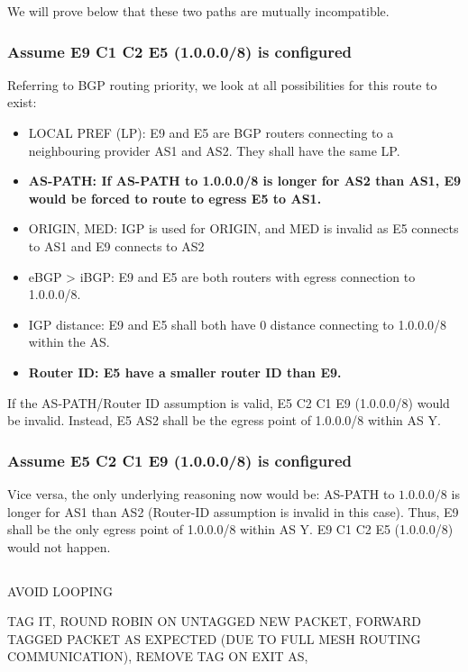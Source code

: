 \documentclass[12pt]{article}
\begin{document}
We will prove below that these two paths are mutually incompatible.

\subsubsection{Assume E9 \textrightarrow{} C1 \textrightarrow{} C2 \textrightarrow{} E5 (1.0.0.0/8) is configured}

Referring to BGP routing priority, we look at all possibilities for this route to exist:
\begin{itemize}
    \item LOCAL PREF (LP): E9 and E5 are BGP routers connecting to a neighbouring provider AS1 and AS2. They shall have the same LP.
    \item \textbf{AS-PATH: If AS-PATH to 1.0.0.0/8 is longer for AS2 than AS1, E9 would be forced to route to egress E5 to AS1.}
    \item \textcolor{mygray}{ORIGIN, MED: IGP is used for ORIGIN, and MED is invalid as E5 connects to AS1 and E9 connects to AS2}
    \item eBGP \textgreater{} iBGP: E9 and E5 are both routers with egress connection to 1.0.0.0/8.
    \item IGP distance: E9 and E5 shall both have 0 distance connecting to 1.0.0.0/8 within the AS.
    \item \textbf{Router ID: E5 have a smaller router ID than E9.}
\end{itemize}

If the AS-PATH/Router ID assumption is valid, E5 \textrightarrow{} C2 \textrightarrow{} C1 \textrightarrow{} E9 (1.0.0.0/8) would be invalid. Instead, E5 \textrightarrow{} AS2 shall be the egress point of 1.0.0.0/8 within AS Y.

\subsubsection{Assume E5 \textrightarrow{} C2 \textrightarrow{} C1 \textrightarrow{} E9 (1.0.0.0/8) is configured}

Vice versa, the only underlying reasoning now would be: AS-PATH to $1.0.0.0/8$ is longer for AS1 than AS2 (Router-ID assumption is invalid in this case). Thus, E9 shall be the only egress point of 1.0.0.0/8 within AS Y. E9 \textrightarrow{} C1 \textrightarrow{} C2 \textrightarrow{} E5 (1.0.0.0/8) would not happen.

\subsection{}

AVOID LOOPING

TAG IT, ROUND ROBIN ON UNTAGGED NEW PACKET, FORWARD TAGGED PACKET AS EXPECTED (DUE TO FULL MESH ROUTING COMMUNICATION), REMOVE TAG ON EXIT AS,
\end{document}
